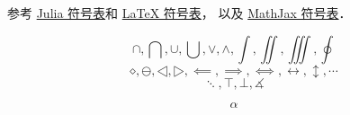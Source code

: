 
参考 \href{https://docs.julialang.org/en/v1/manual/unicode-input/}{Julia 符号表}和 \href{https://oeis.org/wiki/List_of_LaTeX_mathematical_symbols}{LaTeX 符号表}， 以及 \href{http://www.onemathematicalcat.org/MathJaxDocumentation/TeXSyntax.htm#U}{MathJax 符号表}．

\begin{equation}
\cap, ⋂, ∪, ⋃, ∨, ∧, ∫, ∬, ∭, ∮
\end{equation}
\begin{equation}
⋄, ⊖, ◁, ▷, ⟸, ⟹, ⟺, ↔, ↕, ⋯
\end{equation}
\begin{equation}
⋱, ⊤, ⊥, ∡
\end{equation}

\begin{equation}
α
\end{equation}

